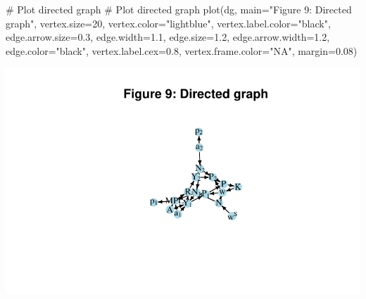 \documentclass[
  letterpaper,
  DIV=11,
  numbers=noendperiod]{scrreprt}
\newenvironment{Shaded}{\begin{snugshade}}{\end{snugshade}}
\newcommand{\AttributeTok}[1]{\textcolor[rgb]{0.40,0.45,0.13}{#1}}
\newcommand{\CommentTok}[1]{\textcolor[rgb]{0.37,0.37,0.37}{#1}}
\newcommand{\DecValTok}[1]{\textcolor[rgb]{0.68,0.00,0.00}{#1}}
\newcommand{\FloatTok}[1]{\textcolor[rgb]{0.68,0.00,0.00}{#1}}
\newcommand{\FunctionTok}[1]{\textcolor[rgb]{0.28,0.35,0.67}{#1}}
\newcommand{\NormalTok}[1]{\textcolor[rgb]{0.00,0.23,0.31}{#1}}
\newcommand{\StringTok}[1]{\textcolor[rgb]{0.13,0.47,0.30}{#1}}
\begin{document}
\begin{Shaded}
\begin{Highlighting}[]
\CommentTok{\# Plot directed graph}
\CommentTok{\# Plot directed graph}
\FunctionTok{plot}\NormalTok{(dg, }\AttributeTok{main=}\StringTok{"Figure 9: Directed graph"}\NormalTok{, }\AttributeTok{vertex.size=}\DecValTok{20}\NormalTok{, }\AttributeTok{vertex.color=}\StringTok{"lightblue"}\NormalTok{, }
     \AttributeTok{vertex.label.color=}\StringTok{"black"}\NormalTok{, }\AttributeTok{edge.arrow.size=}\FloatTok{0.3}\NormalTok{, }\AttributeTok{edge.width=}\FloatTok{1.1}\NormalTok{, }\AttributeTok{edge.size=}\FloatTok{1.2}\NormalTok{,}
     \AttributeTok{edge.arrow.width=}\FloatTok{1.2}\NormalTok{, }\AttributeTok{edge.color=}\StringTok{"black"}\NormalTok{, }\AttributeTok{vertex.label.cex=}\FloatTok{0.8}\NormalTok{, }
     \AttributeTok{vertex.frame.color=}\StringTok{"NA"}\NormalTok{, }\AttributeTok{margin=}\FloatTok{0.08}\NormalTok{)}
\end{Highlighting}
\end{Shaded}

\includegraphics{a_ricardian_two_sector_model_files/figure-pdf/ricardo2_5-2.pdf}
\end{document}
